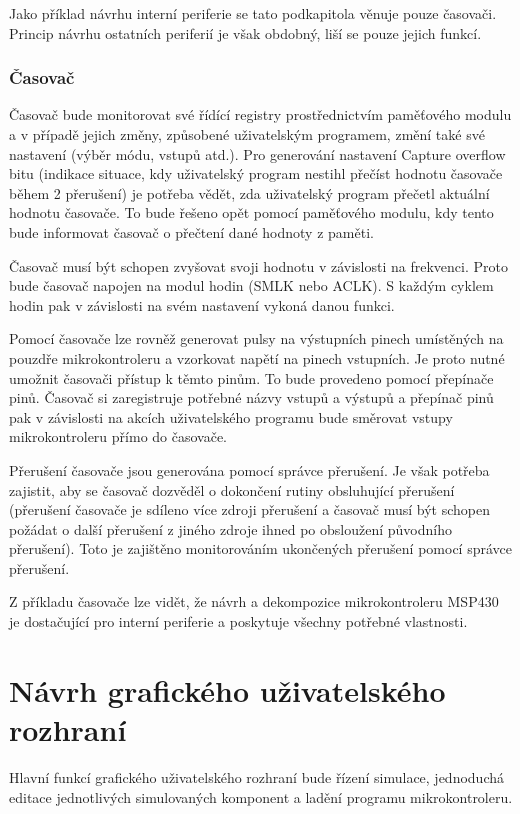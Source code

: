 Jako příklad návrhu interní periferie se tato podkapitola věnuje pouze časovači. Princip návrhu ostatních periferií je však obdobný, liší se pouze jejich funkcí.

\subsubsection{Časovač}

Časovač bude monitorovat své řídící registry prostřednictvím paměťového modulu a v případě jejich změny, způsobené uživatelským programem, změní také své nastavení (výběr módu, vstupů atd.). Pro generování nastavení Capture overflow bitu (indikace situace, kdy uživatelský program nestihl přečíst hodnotu časovače během 2 přerušení) je potřeba vědět, zda uživatelský program přečetl aktuální hodnotu časovače. To bude řešeno opět pomocí paměťového modulu, kdy tento bude informovat časovač o přečtení dané hodnoty z paměti.

Časovač musí být schopen zvyšovat svoji hodnotu v závislosti na frekvenci. Proto bude časovač napojen na modul hodin (SMLK nebo ACLK). S každým cyklem
hodin pak v závislosti na svém nastavení vykoná danou funkci.

Pomocí časovače lze rovněž generovat pulsy na výstupních pinech umístěných na pouzdře mikrokontroleru a vzorkovat napětí na pinech vstupních.
Je proto nutné umožnit časovači přístup k těmto pinům. To bude provedeno pomocí přepínače pinů. Časovač si zaregistruje potřebné názvy vstupů a výstupů
a přepínač pinů pak v závislosti na akcích uživatelského programu bude směrovat vstupy mikrokontroleru přímo do časovače.

Přerušení časovače jsou generována pomocí správce přerušení. Je však potřeba zajistit, aby se časovač dozvěděl o dokončení rutiny obsluhující přerušení
(přerušení časovače je sdíleno více zdroji přerušení a časovač musí být schopen požádat o další přerušení z jiného zdroje ihned po obsloužení původního přerušení). Toto je zajištěno monitorováním ukončených přerušení pomocí správce přerušení.

Z příkladu časovače lze vidět, že návrh a dekompozice mikrokontroleru MSP430 je dostačující pro interní periferie a poskytuje všechny potřebné vlastnosti.

\section{Návrh grafického uživatelského rozhraní}

Hlavní funkcí grafického uživatelského rozhraní bude řízení simulace, jednoduchá editace jednotlivých simulovaných komponent a ladění programu mikrokontroleru.

